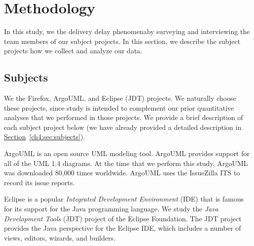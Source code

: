 \section{Methodology} \label{ch6:studysettings}

In this study, we \DIFdelbegin {}\DIFdelend \DIFaddbegin {}\DIFaddend the delivery delay phenomena\DIFaddbegin {}\DIFaddend by surveying and
interviewing the team members \DIFaddbegin \DIFadd{(}\ie {}\DIFaddend of our subject projects. In
this section, we describe the subject projects \DIFaddbegin {}\DIFaddend how we collect and analyze
our data.

\subsection{Subjects}

We \DIFdelbegin {}\DIFdelend \DIFaddbegin {}\DIFaddend the Firefox, ArgoUML, and Eclipse (JDT) projects.
We naturally choose these projects, since \DIFdelbegin {}\DIFdelend \DIFaddbegin {}\DIFaddend study is intended
to complement our prior quantitative analyses that we performed in those
projects.  We provide a brief description of each subject project below (we have
already provided a detailed description in
\hyperref[ch4:sec:subjects]{Section}~\ref{ch4:sec:subjects}).

ArgoUML is an open source UML modeling tool. ArgoUML provides support for all of
the UML 1.4 diagrams. At the time that we perform this study, ArgoUML was
downloaded 80,000 times worldwide.
ArgoUML uses the IssueZilla ITS to record its issue
reports.

Eclipse is a popular {\em Integrated Development Environment} (IDE) that is
famous for its support for the Java programming
language. We study the {\em Java
Development Tools} (JDT) project of the Eclipse
Foundation.
The JDT project provides the Java perspective for the Eclipse IDE, which
includes a number of views, editors, wizards, and builders. 

